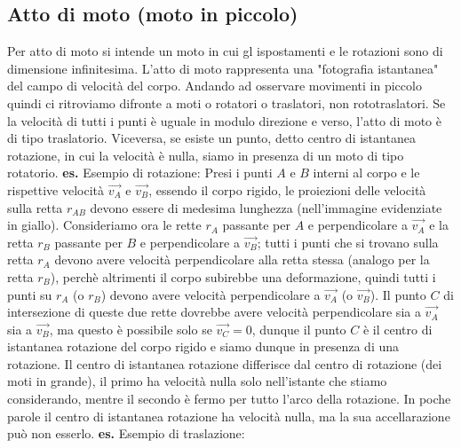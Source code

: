 \subsection{Atto di moto (moto in piccolo)}
Per atto di moto si intende un moto in cui gl ispostamenti e le rotazioni sono di dimensione infinitesima. L'atto di moto rappresenta una "fotografia istantanea" del campo di velocità del corpo.\newline
Andando ad osservare movimenti in piccolo quindi ci ritroviamo difronte a moti o rotatori o traslatori, non rototraslatori. Se la velocità di tutti i punti è uguale in modulo direzione e verso, l'atto di moto è di tipo traslatorio. Viceversa, se esiste un punto, detto centro di istantanea rotazione, in cui la velocità è nulla, siamo in presenza di un moto di tipo rotatorio.\newline
\textbf{es.} Esempio di rotazione:\newline
Presi i punti $A$ e $B$ interni al corpo e le rispettive velocità $\vec{v_A}$ e $\vec{v_B}$, essendo il corpo rigido, le proiezioni delle velocità sulla retta $r_{AB}$ devono essere di medesima lunghezza (nell'immagine evidenziate in giallo).\newline
Consideriamo ora le rette $r_A$ passante per $A$ e perpendicolare a $\vec{v_A}$ e la retta $r_B$ passante per $B$ e perpendicolare a $\vec{v_B}$; tutti i punti che si trovano sulla retta $r_A$ devono avere velocità perpendicolare alla retta stessa (analogo per la retta $r_B$), perchè altrimenti il corpo subirebbe una deformazione, quindi tutti i punti su $r_A$ (o $r_B$) devono avere velocità perpendicolare a $\vec{v_A}$ (o $\vec{v_B}$). Il punto $C$ di intersezione di queste due rette dovrebbe avere velocità perpendicolare sia a $\vec{v_A}$ sia a $\vec{v_B}$, ma questo è possibile solo se $\vec{v_C} = 0$, dunque il punto $C$ è il centro di istantanea rotazione del corpo rigido e siamo dunque in presenza di una rotazione.\newline
Il centro di istantanea rotazione differisce dal centro di rotazione (dei moti in grande), il primo ha velocità nulla solo nell'istante che stiamo considerando, mentre il secondo è fermo per tutto l'arco della rotazione. In poche parole il centro di istantanea rotazione ha velocità nulla, ma la sua accellarazione può non esserlo.\newline
\newline
\textbf{es.} Esempio di traslazione:\newline

